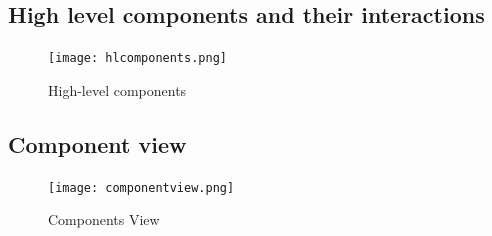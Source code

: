 \documentclass[12pt, letterpaper]{article}
\begin{document}
\subsection{High level components and their interactions}

\begin{figure}[H]
\centering
\texttt{[image: hlcomponents.png]}
\caption{High-level components}
\label{fig:hlcomp}
\end{figure}

\subsection{Component view}

\begin{figure}[H]
\centering
\texttt{[image: componentview.png]} 
\caption{Components View}
\label{fig:compview}
\end{figure}
\end{document}
